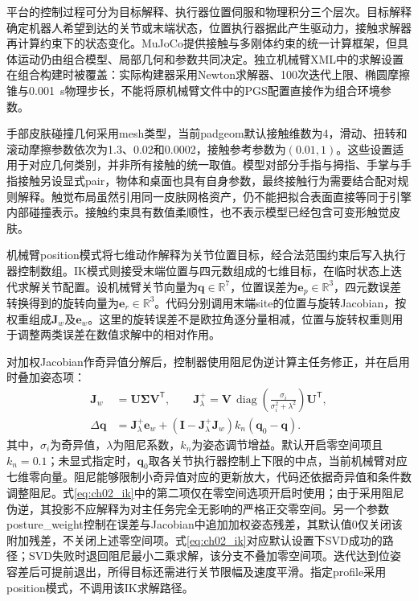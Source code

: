 平台的控制过程可分为目标解释、执行器位置伺服和物理积分三个层次。目标解释确定机器人希望到达的关节或末端状态，位置执行器据此产生驱动力，接触求解器再计算约束下的状态变化。MuJoCo提供接触与多刚体约束的统一计算框架\cite{todorov2012mujoco,mujoco2026computation}，但具体运动仍由组合模型、局部几何和参数共同决定。独立机械臂XML中的求解设置在组合构建时被覆盖：实际构建器采用Newton求解器、100次迭代上限、椭圆摩擦锥与0.001~s物理步长，不能将原机械臂文件中的PGS配置直接作为组合环境参数。

手部皮肤碰撞几何采用mesh类型，当前padgeom默认接触维数为4，滑动、扭转和滚动摩擦参数依次为1.3、0.02和0.0002，接触参考参数为$(0.01,1)$。这些设置适用于对应几何类别，并非所有接触的统一取值。模型对部分手指与拇指、手掌与手指接触另设显式pair，物体和桌面也具有自身参数，最终接触行为需要结合配对规则解释。触觉布局虽然引用同一皮肤网格资产，仍不能把拟合表面直接等同于引擎内部碰撞表示。接触约束具有数值柔顺性，也不表示模型已经包含可变形触觉皮肤。

机械臂position模式将七维动作解释为关节位置目标，经合法范围约束后写入执行器控制数组。IK模式则接受末端位置与四元数组成的七维目标，在临时状态上迭代求解关节配置。设机械臂关节向量为$\boldsymbol q\in\mathbb R^7$，位置误差为$\boldsymbol e_p\in\mathbb R^3$，四元数误差转换得到的旋转向量为$\boldsymbol e_r\in\mathbb R^3$。代码分别调用末端site的位置与旋转Jacobian，按权重组成$\boldsymbol J_w$及$\boldsymbol e_w$。这里的旋转误差不是欧拉角逐分量相减，位置与旋转权重则用于调整两类误差在数值求解中的相对作用。

对加权Jacobian作奇异值分解后，控制器使用阻尼伪逆计算主任务修正，并在启用时叠加姿态项：
\begin{equation}
 \begin{aligned}
  \boldsymbol J_w&=\boldsymbol U\boldsymbol\Sigma\boldsymbol V^{\mathsf T},\qquad
  \boldsymbol J_{\lambda}^{+}=\boldsymbol V\,
  \operatorname{diag}\!\left(\frac{\sigma_i}{\sigma_i^2+\lambda^2}\right)
  \boldsymbol U^{\mathsf T},\\
  \Delta\boldsymbol q&=\boldsymbol J_{\lambda}^{+}\boldsymbol e_w+
  \left(\boldsymbol I-\boldsymbol J_{\lambda}^{+}\boldsymbol J_w\right)
  k_n(\boldsymbol q_0-\boldsymbol q).
 \end{aligned}
 \label{eq:ch02_ik}
\end{equation}
其中，$\sigma_i$为奇异值，$\lambda$为阻尼系数，$k_n$为姿态调节增益。默认开启零空间项且$k_n=0.1$；未显式指定时，$\boldsymbol q_0$取各关节执行器控制上下限的中点，当前机械臂对应七维零向量。阻尼能够限制小奇异值对应的更新放大，代码还依据奇异值和条件数调整阻尼。式\ref{eq:ch02_ik}中的第二项仅在零空间选项开启时使用；由于采用阻尼伪逆，其投影不应解释为对主任务完全无影响的严格正交零空间。另一个参数posture\_weight控制在误差与Jacobian中追加加权姿态残差，其默认值0仅关闭该附加残差，不关闭上述零空间项。式\ref{eq:ch02_ik}对应默认设置下SVD成功的路径；SVD失败时退回阻尼最小二乘求解，该分支不叠加零空间项。迭代达到位姿容差后可提前退出，所得目标还需进行关节限幅及速度平滑。指定profile采用position模式，不调用该IK求解路径。

